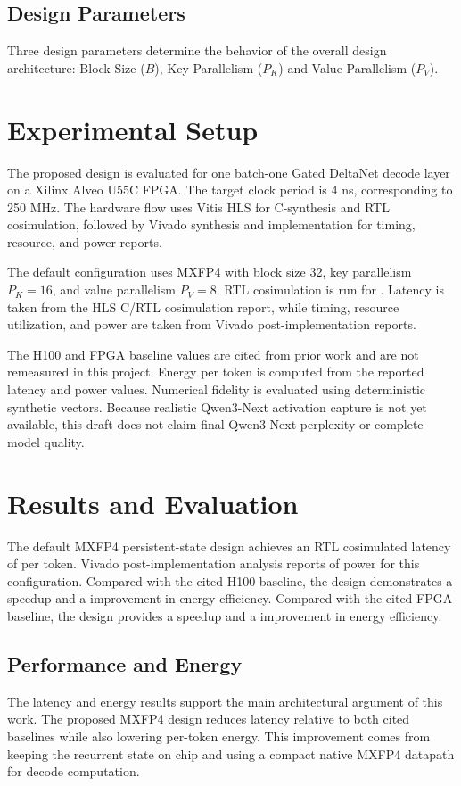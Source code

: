 ﻿\documentclass[conference]{IEEEtran}
\begin{document}
\subsection{Design Parameters}
Three design parameters determine the behavior of the overall design architecture: Block Size ($B$), Key Parallelism ($P_K$) and Value Parallelism ($P_V$).

\section{Experimental Setup}
The proposed design is evaluated for one batch-one Gated DeltaNet decode layer on a Xilinx Alveo U55C FPGA. The target clock period is 4 ns, corresponding to 250 MHz. The hardware flow uses Vitis HLS for C-synthesis and RTL cosimulation, followed by Vivado synthesis and implementation for timing, resource, and power reports.

The default configuration uses MXFP4 with block size 32, key parallelism $P_K=16$, and value parallelism $P_V=8$. RTL cosimulation is run for \OursMxfpFourBThirtyTwoTokensCosim. Latency is taken from the HLS C/RTL cosimulation report, while timing, resource utilization, and power are taken from Vivado post-implementation reports.

The H100 and FPGA baseline values are cited from prior work and are not remeasured in this project. Energy per token is computed from the reported latency and power values. Numerical fidelity is evaluated using deterministic synthetic vectors. Because realistic Qwen3-Next activation capture is not yet available, this draft does not claim final Qwen3-Next perplexity or complete model quality.

\section{Results and Evaluation}
The default MXFP4 persistent-state design achieves an RTL cosimulated latency of \OursMxfpFourBThirtyTwoLatencyUs per token. Vivado post-implementation analysis reports \OursMxfpFourBThirtyTwoPowerW of power for this configuration. Compared with the cited H100 baseline, the design demonstrates a \HeadlineSpeedupVsHOneHundred speedup and a \HeadlineEnergyEfficiencyVsHOneHundred improvement in energy efficiency. Compared with the cited FPGA baseline, the design provides a \HeadlineSpeedupVsUsc speedup and a \HeadlineEnergyEfficiencyVsUsc improvement in energy efficiency.

\subsection{Performance and Energy}
The latency and energy results support the main architectural argument of this work. The proposed MXFP4 design reduces latency relative to both cited baselines while also lowering per-token energy. This improvement comes from keeping the recurrent state on chip and using a compact native MXFP4 datapath for decode computation.
\end{document}

